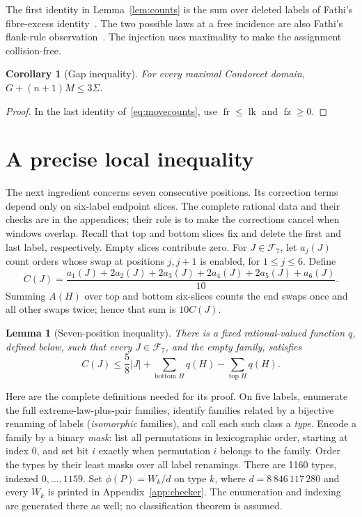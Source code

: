 \documentclass[11pt,letterpaper]{article}
\newtheorem{lemma}[theorem]{Lemma}
\newtheorem{corollary}[theorem]{Corollary}
\theoremstyle{definition}
\newcommand{\F}{\mathcal F}
\newcommand{\Sig}{\Sigma}
\newcommand{\fr}{\operatorname{fr}}
\newcommand{\fz}{\operatorname{fz}}
\newcommand{\lk}{\operatorname{lk}}
\begin{document}
The first identity in Lemma~\ref{lem:counts} is the sum over deleted
labels of Fathi's fibre-excess identity~\cite[eq.\ (96)]{Fathi}.
The two possible laws at a free incidence are also Fathi's flank-rule
observation~\cite[Lemma K.52]{Fathi}. The injection uses maximality
to make the assignment collision-free.

\begin{corollary}[Gap inequality]\label{cor:gap}
For every maximal Condorcet domain,
\(G+(n+1)M\leq3\Sig\).
\end{corollary}
\begin{proof}
In the last identity of~\eqref{eq:movecounts}, use
\(\fr\leq\lk\) and \(\fz\geq0\).
\end{proof}

\clearpage
\section{A precise local inequality}\label{sec:finite}
The next ingredient concerns seven consecutive positions. Its
correction terms depend only on six-label endpoint slices. The complete
rational data and their checks are in the appendices; their role is to
make the corrections cancel when windows overlap.
Recall that top and bottom slices fix and delete the first and last
label, respectively. Empty slices contribute zero.
For \(J\in\F_7\), let \(a_j(J)\) count orders whose swap at
positions \(j,j+1\) is enabled, for \(1\leq j\leq6\). Define
\begin{equation}\label{eq:cost}
 C(J)=\frac{a_1(J)+2a_2(J)+2a_3(J)+2a_4(J)+2a_5(J)+a_6(J)}{10}.
\end{equation}
Summing \(A(H)\) over top and bottom six-slices counts the end swaps
once and all other swaps twice; hence that sum is \(10C(J)\).

\begin{lemma}[Seven-position inequality]\label{lem:finite}
There is a fixed rational-valued function \(q\), defined below, such that
every \(J\in\F_7\), and the empty family, satisfies
\begin{equation}\label{eq:finite}
 C(J)\leq\frac58|J|+
   \sum_{\text{bottom }H}q(H)-\sum_{\text{top }H}q(H).
\end{equation}
\end{lemma}

Here are the complete definitions needed for its proof.
On five labels, enumerate the full extreme-law-plus-pair families,
identify families related by a bijective renaming of labels
(\emph{isomorphic} families), and call each such class a \emph{type}. Encode a family by a binary \emph{mask}:
list all permutations in lexicographic order, starting at index 0,
and set bit \(i\) exactly when permutation \(i\) belongs to the family.
Order the types by their least masks over all label renamings.
There are 1160 types,
indexed \(0,\ldots,1159\). Set \(\phi(P)=W_k/d\) on type \(k\), where
\(d=8\,846\,117\,280\) and every \(W_k\) is printed in
Appendix~\ref{app:checker}. The enumeration and indexing are generated
there as well; no classification theorem is assumed.
\end{document}
